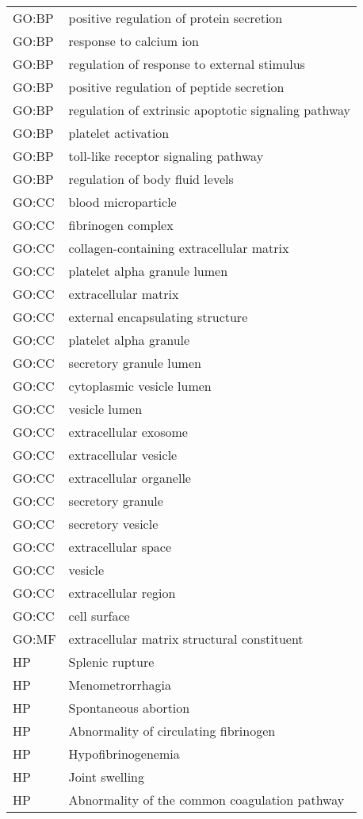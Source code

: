 \begin{longtable}{lp{12cm}}
GO:BP & positive regulation of protein secretion\\
GO:BP & response to calcium ion\\
GO:BP & regulation of response to external stimulus\\
GO:BP & positive regulation of peptide secretion\\
GO:BP & regulation of extrinsic apoptotic signaling pathway\\
GO:BP & platelet activation\\
GO:BP & toll-like receptor signaling pathway\\
GO:BP & regulation of body fluid levels\\
GO:CC & blood microparticle\\
GO:CC & fibrinogen complex\\
GO:CC & collagen-containing extracellular matrix\\
GO:CC & platelet alpha granule lumen\\
GO:CC & extracellular matrix\\
GO:CC & external encapsulating structure\\
GO:CC & platelet alpha granule\\
GO:CC & secretory granule lumen\\
GO:CC & cytoplasmic vesicle lumen\\
GO:CC & vesicle lumen\\
GO:CC & extracellular exosome\\
GO:CC & extracellular vesicle\\
GO:CC & extracellular organelle\\
GO:CC & secretory granule\\
GO:CC & secretory vesicle\\
GO:CC & extracellular space\\
GO:CC & vesicle\\
GO:CC & extracellular region\\
GO:CC & cell surface\\
GO:MF & extracellular matrix structural constituent\\
HP & Splenic rupture\\
HP & Menometrorrhagia\\
HP & Spontaneous abortion\\
HP & Abnormality of circulating fibrinogen\\
HP & Hypofibrinogenemia\\
HP & Joint swelling\\
HP & Abnormality of the common coagulation pathway\\

\end{longtable}
